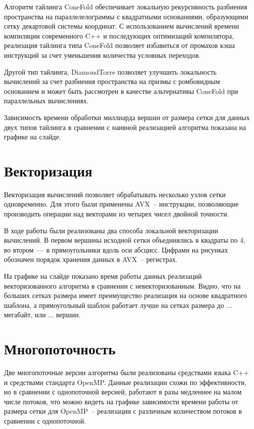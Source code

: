 \documentclass[18pt]{article}
\begin{document}
Алгоритм тайлинга ConeFold обеспечивает локальную рекурсивность разбиения
пространства на параллелелограммы с квадратными основаниями, образующими сетку
декартовой системы координат. 
С использованием вычислений времени компиляции современного C++ и 
последующих оптимизаций компилятора, реализация тайлинга типа ConeFold 
позволяет избавиться от промахов кэша инструкций за счет уменьшения количества
условных переходов.

Другой тип тайлинга, DiamondTorre позволяет улучшить локальность вычислений 
за счет разбиения пространства на призмы с ромбовидным основанием и может 
быть рассмотрен в качестве альтернативы ConeFold при параллельных вычислениях.

Зависимость времени обработки миллиарда вершин от размера сетки 
для данных двух типов тайлинга в сравнении с наивной реализацией алгоритма 
показана на графике на слайде.

\section{Векторизация}
\par
Векторизация вычислений позволяет обрабатывать несколько узлов сетки 
одновременно. Для этого были применены AVX~-- инструкции, позволяющие 
производить операции над векторами из четырех чисел двойной точности.

В ходе работы были реализованы два способа локальной векторизации вычислений.
В первом вершины исходной сетки объединялись в квадраты по 4, 
во втором~--- в прямоугольники вдоль оси абсцисс.
Цифрами на рисунках обозначен порядок хранения данных в AVX~-- регистрах.

На графике на слайде показано время работы данных реализаций векторизованного 
алгоритма в сравнении с невекторизованным. Видно, что на больших сетках  
размера имеет преимущество реализация на основе квадратного шаблона, 
а прямоугольный шаблон работает лучше на сетках размера до ... мегабайт, 
или ... вершин.

\section{Многопоточность}
\par
Две многопоточные версии алгоритма были реализованы средствами языка C++ и 
средствами стандарта OpenMP. Данные реализации схожи по эффективности, но в 
сравнении с однопоточной версией, работают в разы медленнее на малом числе 
потоков, что можно видеть на графике зависимости времени работы от 
размера сетки для OpenMP~-- реализации с различным количеством потоков 
в сравнении с однопоточной.
\end{document}
